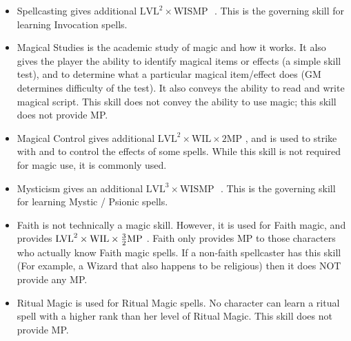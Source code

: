 \documentclass[twoside]{book}
\begin{document}
\begin{itemize}
      
  \item   Spellcasting gives additional \begin{math}    
                    {\textrm{LVL}}^{ 2 }   \times  \textrm{WIS}\textrm{MP
                     }    \end{math} . This is the governing skill
                      for learning Invocation spells.
              
  \item   Magical Studies is the academic study of magic
                 and how it works. It also gives the player the ability
                 to identify magical items or effects (a simple skill
                 test), and to determine what a particular magical
                 item/effect does (GM determines difficulty of the test).
                 It also conveys the ability to read and write magical
                 script. This skill does not convey the ability to use
                 magic; this skill does not provide MP. 
  \item   Magical Control gives additional \begin{math}    
                    {\textrm{LVL}}^{ 2 }   \times    \textrm{WIL}  
                      \times     2   \textrm{MP}  
                       \end{math} , and is used to strike with and to control
                      the effects of some spells. While this skill is not
                      required for magic use, it is commonly used.
              
  \item   Mysticism gives an additional \begin{math}    
                    {\textrm{LVL}}^{ 3 }   \times    \textrm{WIS}  \textrm{MP
                     }    \end{math} . This is the governing skill
                      for learning Mystic / Psionic spells.
              
  \item   Faith is not technically a magic skill. However,
                 it is used for Faith magic, and provides \begin{math}  
                    {\textrm{LVL}}^{ 2 }   \times    \textrm{WIL}  
                      \times    {{ 3 }\over{ 2
                      }}  \textrm{MP}    \end{math} . Faith
                      only provides MP to those characters who actually
                      know Faith magic spells. If a non-faith spellcaster
                      has this skill (For example, a Wizard that also
                      happens to be religious) then it does NOT provide
                      any MP.
              
  \item   Ritual Magic is used for Ritual Magic spells. No
                 character can learn a ritual spell with a higher rank
                 than her level of Ritual Magic. This skill does not
                 provide MP. 
\end{itemize}
  
\end{document}
